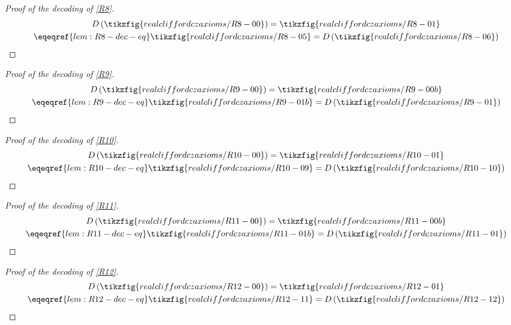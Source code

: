 \begin{proof}[Proof of the decoding of \cref{R8}]
    \begin{gather*}
        D\left(\tikzfig{realcliffordczaxioms/R8-00}\right)
        = \tikzfig{realcliffordczaxioms/R8-01}\\
        \eqeqref{lem:R8-dec-eq} \tikzfig{realcliffordczaxioms/R8-05}
        = D\left(\tikzfig{realcliffordczaxioms/R8-06}\right)
    \end{gather*}
\end{proof}

\begin{proof}[Proof of the decoding of \cref{R9}]
    \begin{gather*}
        D\left(\tikzfig{realcliffordczaxioms/R9-00}\right)
        = \tikzfig{realcliffordczaxioms/R9-00b}\\
        \eqeqref{lem:R9-dec-eq} \tikzfig{realcliffordczaxioms/R9-01b}
        = D\left(\tikzfig{realcliffordczaxioms/R9-01}\right)
    \end{gather*}
\end{proof}

\begin{proof}[Proof of the decoding of \cref{R10}]
    \begin{gather*}
        D\left(\tikzfig{realcliffordczaxioms/R10-00}\right)
        = \tikzfig{realcliffordczaxioms/R10-01}\\
        \eqeqref{lem:R10-dec-eq} \tikzfig{realcliffordczaxioms/R10-09}
        = D\left(\tikzfig{realcliffordczaxioms/R10-10}\right)
    \end{gather*}
\end{proof}

\begin{proof}[Proof of the decoding of \cref{R11}]
    \begin{gather*}
        D\left(\tikzfig{realcliffordczaxioms/R11-00}\right)
        = \tikzfig{realcliffordczaxioms/R11-00b}\\
        \eqeqref{lem:R11-dec-eq} \tikzfig{realcliffordczaxioms/R11-01b}
        = D\left(\tikzfig{realcliffordczaxioms/R11-01}\right)
    \end{gather*}
\end{proof}

\begin{proof}[Proof of the decoding of \cref{R12}]
    \begin{gather*}
        D\left(\tikzfig{realcliffordczaxioms/R12-00}\right)
        = \tikzfig{realcliffordczaxioms/R12-01}\\
        \eqeqref{lem:R12-dec-eq} \tikzfig{realcliffordczaxioms/R12-11}
        = D\left(\tikzfig{realcliffordczaxioms/R12-12}\right)
    \end{gather*}
\end{proof}

